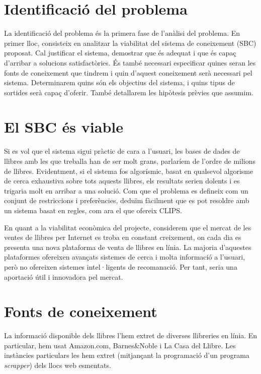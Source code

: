 
\section{Identificació del problema}

La identificació del problema és la primera fase de l'anàlisi del problema. En primer lloc, consisteix en analitzar la viabilitat del sistema de coneixement (SBC) proposat. Cal justificar el sistema, demostrar que és adequat i que és capaç d'arribar a solucions satisfactòries. És també necessari especificar quines seran les fonts de coneixement que tindrem i quin d'aquest coneixement serà necessari pel sistema. Determinarem quins són els objectius del sistema, i quins tipus de sortides serà capaç d'oferir. També detallarem les hipòtesis prèvies que assumim.

\section{El SBC és viable}

Si es vol que el sistema sigui pràctic de cara a l'usuari, les bases de dades de llibres amb les que treballa han de ser molt grans, parlaríem de l'ordre de milions de llibres. Evidentment, si el sistema fos algorísmic, basat en qualsevol algorisme de cerca exhaustiva sobre tots aquests llibres, els resultats serien dolents i es trigaria molt en arribar a una solució. Com que el problema es defineix com un conjunt de restriccions i preferències, deduïm fàcilment que es pot resoldre amb un sistema basat en regles, com ara el que ofereix CLIPS.

En quant a la viabilitat econòmica del projecte, considerem que el mercat de les ventes de llibres per Internet es troba en constant creixement, on cada dia es presenta una nova plataforma de venta de llibres en línia. La majoria d'aquestes plataformes ofereixen avançats sistemes de cerca i molta informació a l'usuari, però no ofereixen sistemes intel·ligents de recomanació. Per tant, seria una aportació útil i innovadora pel mercat.

\section{Fonts de coneixement}

La informació disponible dels llibres l'hem extret de diverses llibreries en línia. En particular, hem usat Amazon.com, Barnes\&Noble i La Casa del Llibre. Les instàncies particulars les hem extret (mitjançant la programació d'un programa \emph{scrapper}) dels llocs web esmentats.

